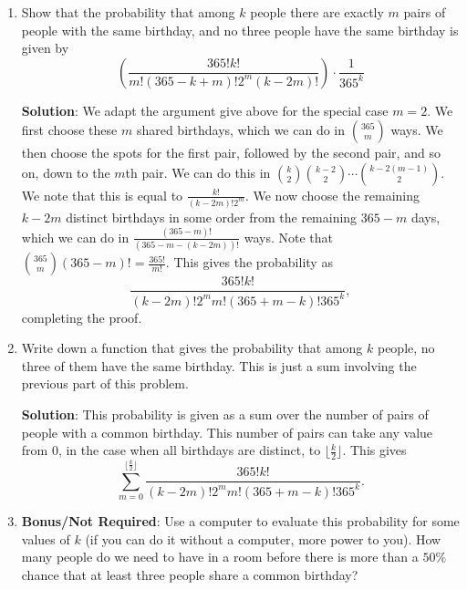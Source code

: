 \documentclass[11pt]{article}
\begin{document}
\begin{enumerate}
\begin{enumerate}
{\bf Solution}: We first pick the two shared birthdays.  We then pick the spots for one of the two pairs, which we can do in $\binom{k}{2}$ ways.  We then pick the spots for the next pair, which we can do in $\binom{k-2}{2}$ ways.  We note that 
\[
\binom{k}{2} \binom{k-2}{2} = \frac{k!}{(k-4)! 2^2}.
\]
We then choose the remaining birthdays in some order in the remaining $k-4$ spots.  This gives 
\[
\frac{\binom{365}{2} \frac{k!}{(k-4)! 2^2} \frac{363!}{(363-(k-4))!}}{365^k} = \frac{365! k!}{2!  (k-4)! 2^2 (363-(k-4))! 365^k}.
\]


\item Show that the probability that among $k$ people there are exactly $m$ pairs of people with the same birthday, and no three people have the same birthday is given by
\[
\left(\frac{365! k!}{m! (365-k+m)! 2^m (k-2m)!}\right) \cdot \frac{1}{365^k}
\]

{\bf Solution}: We adapt the argument give above for the special case $m=2$.  We first choose these $m$ shared birthdays, which we can do in $\binom{365}{m}$ ways.  We then choose the spots for the first pair, followed by the second pair, and so on, down to the $m$th pair.  We can do this in $\binom{k}{2} \binom{k-2}{2}\cdots \binom{k-2(m-1)}{2}$.  We note that this is equal to $\frac{k!}{(k-2m)! 2^m}$.  We now choose the remaining $k-2m$ distinct birthdays in some order from the remaining $365-m$ days, which we can do in $\frac{(365-m)!}{(365-m-(k-2m))!}$ ways.  Note that $\binom{365}{m} (365-m)! = \frac{365!}{m!}$.  This gives the probability as
\[
\frac{365! k!}{(k-2m)! 2^m m! (365+m-k)! 365^k},
\]
completing the proof.

\item Write down a function that gives the probability that among $k$ people, no three of them have the same birthday.  This is just a sum involving the previous part of this problem.

{\bf Solution}: This probability is given as a sum over the number of pairs of people with a common birthday.  This number of pairs can take any value from $0$, in the case when all birthdays are distinct, to $\lfloor \frac{k}{2} \rfloor$.  This gives
\[
\sum_{m=0}^{\lfloor \frac{k}{2} \rfloor} \frac{365! k!}{(k-2m)! 2^m m! (365+m-k)! 365^k}.
\]

\item \textbf{Bonus/Not Required}: Use a computer to evaluate this probability for some values of $k$ (if you can do it without a computer, more power to you).  How many people do we need to have in a room before there is more than a $50\%$ chance that at least three people share a common birthday?


\end{enumerate}
\end{enumerate}
\end{document}
